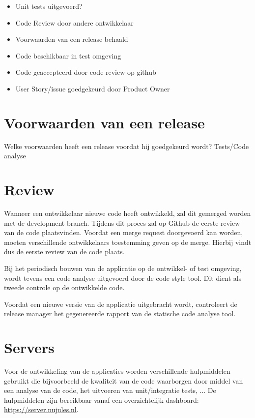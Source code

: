 	\begin{itemize}
			\item Unit tests uitgevoerd?
			\item Code Review door andere ontwikkelaar
			\item Voorwaarden van een release behaald
			\item Code beschikbaar in test omgeving
			\item Code geaccepteerd door code review op github
			\item User Story/issue goedgekeurd door Product Owner		
	\end{itemize}

\section{Voorwaarden van een release}
Welke voorwaarden heeft een release voordat hij goedgekeurd wordt? Tests/Code analyse

\section{Review}
Wanneer een ontwikkelaar nieuwe code heeft ontwikkeld, zal dit gemerged worden met de development branch. Tijdens dit proces zal op Github de eerste review van de code plaatsvinden. Voordat een merge request doorgevoerd kan worden, moeten verschillende ontwikkelaars toestemming geven op de merge. Hierbij vindt dus de eerste review van de code plaats.

Bij het periodisch bouwen van de applicatie op de ontwikkel- of test omgeving, wordt tevens een code analyse uitgevoerd door de code style tool. Dit dient als tweede controle op de ontwikkelde code.

Voordat een nieuwe versie van de applicatie uitgebracht wordt, controleert de release manager het gegenereerde rapport van de statische code analyse tool.

\section{Servers}
Voor de ontwikkeling van de applicaties worden verschillende hulpmiddelen gebruikt die bijvoorbeeld de kwaliteit van de code waarborgen door middel van een analyse van de code, het uitvoeren van unit/integratie tests, ...
De hulpmiddelen zijn bereikbaar vanaf een overzichtelijk dashboard: \href{https://server.nujules.nl}{https://server.nujules.nl}.

